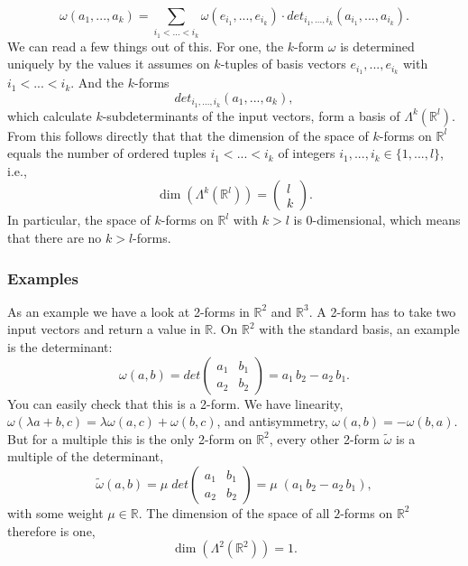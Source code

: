 \[\omega(a_1,...,a_k)= \sum_{i_1<...<i_k} \omega(e_{i_1},...,e_{i_k}) \cdot det_{i_1,...,i_k}(a_{i_1},...,a_{i_{k}}).\]
We can read a few things out of this. For one, the $k$-form $\omega$ is determined uniquely by the values it assumes on $k$-tuples of basis vectors $e_{i_1},...,e_{i_k}$ with $i_1 <...< i_k$. And the $k$-forms
\[det_{i_1,...,i_k}(a_{1},...,a_{k}),\]
which calculate $k$-subdeterminants of the input vectors, form a basis of $\Lambda^k(\mathbb R^l)$. From this follows directly that that the dimension of the  space of $k$-forms on $\mathbb R^l$ equals the number of ordered tuples $i_1<...<i_k$ of integers $i_1,...,i_k \in \{1,...,l\} $, i.e.,
\[\dim (\Lambda^k(\mathbb R^l)) = \begin{pmatrix}
l \\
k
\end{pmatrix}.\] 
In particular, the space of $k$-forms on $\mathbb R^l$ with $k>l$ is 0-dimensional, which means that there are no $k>l$-forms.

\subsubsection{Examples}
As an example we have a look at 2-forms in $\mathbb R^2$ and $\mathbb R^3$. A 2-form has to take two input vectors and return a value in $\mathbb R$. On $\mathbb R^2$ with the standard basis, an example is the determinant:
\[\omega(a,b) = det \begin{pmatrix}
	a_1 & b_1 \\
	a_2 & b_2 
\end{pmatrix} = a_1\, b_2 -a_2\,b_1.\]
You can easily check that this is a 2-form. We have linearity, $\omega(\lambda a + b, c) = \lambda \omega(a, c) + \omega(b, c)$, and antisymmetry, $\omega(a,b) = - \omega(b,a)$. But for a multiple  this is the only 2-form on $\mathbb R^2$, every other 2-form $\widetilde{\omega}$ is a multiple of the determinant,
\[\widetilde{\omega}(a,b) = \mu \; det \begin{pmatrix}
	a_1 & b_1 \\
	a_2 & b_2 
\end{pmatrix} = \mu \; (a_1\, b_2 -a_2\,b_1),\]
with some weight $\mu \in \mathbb R$. The dimension of the space of all $2$-forms on $\mathbb R^2$ therefore is one,
\[\dim(\Lambda^2(\mathbb R^2)) = 1.\]

